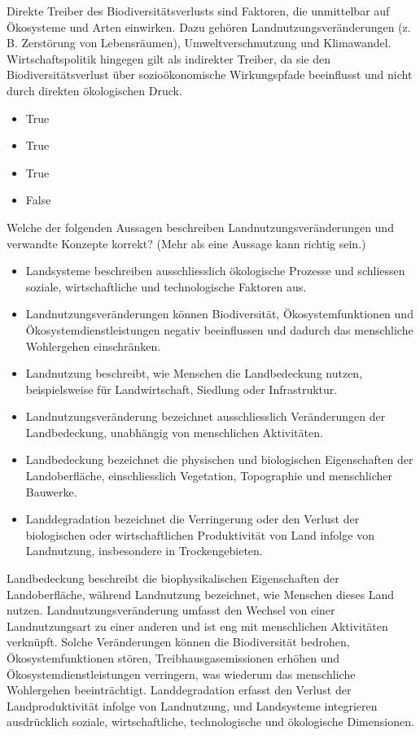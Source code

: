 \documentclass[
  nswissgerman,
  a4paper,
  DIV=11,
  numbers=noendperiod,
  oneside,
  openany]{scrreprt}
\providecommand{\tightlist}{%
  \setlength{\itemsep}{0pt}\setlength{\parskip}{0pt}}
\begin{document}
Direkte Treiber des Biodiversitätsverlusts sind Faktoren, die
unmittelbar auf Ökosysteme und Arten einwirken. Dazu gehören
Landnutzungsveränderungen (z. B. Zerstörung von Lebensräumen),
Umweltverschmutzung und Klimawandel. Wirtschaftspolitik hingegen gilt
als indirekter Treiber, da sie den Biodiversitätsverlust über
sozioökonomische Wirkungspfade beeinflusst und nicht durch direkten
ökologischen Druck.

\begin{itemize}
\tightlist
\item
  True
\item
  True
\item
  True
\item
  False
\end{itemize}

Welche der folgenden Aussagen beschreiben Landnutzungsveränderungen und
verwandte Konzepte korrekt? (Mehr als eine Aussage kann richtig sein.)

\begin{itemize}
\tightlist
\item[$\square$]
  Landsysteme beschreiben ausschliesslich ökologische Prozesse und
  schliessen soziale, wirtschaftliche und technologische Faktoren aus.
\item[$\square$]
  Landnutzungsveränderungen können Biodiversität, Ökosystemfunktionen
  und Ökosystemdienstleistungen negativ beeinflussen und dadurch das
  menschliche Wohlergehen einschränken.
\item[$\square$]
  Landnutzung beschreibt, wie Menschen die Landbedeckung nutzen,
  beispielsweise für Landwirtschaft, Siedlung oder Infrastruktur.
\item[$\square$]
  Landnutzungsveränderung bezeichnet ausschliesslich Veränderungen der
  Landbedeckung, unabhängig von menschlichen Aktivitäten.
\item[$\square$]
  Landbedeckung bezeichnet die physischen und biologischen Eigenschaften
  der Landoberfläche, einschliesslich Vegetation, Topographie und
  menschlicher Bauwerke.
\item[$\square$]
  Landdegradation bezeichnet die Verringerung oder den Verlust der
  biologischen oder wirtschaftlichen Produktivität von Land infolge von
  Landnutzung, insbesondere in Trockengebieten.
\end{itemize}

Landbedeckung beschreibt die biophysikalischen Eigenschaften der
Landoberfläche, während Landnutzung bezeichnet, wie Menschen dieses Land
nutzen. Landnutzungsveränderung umfasst den Wechsel von einer
Landnutzungsart zu einer anderen und ist eng mit menschlichen
Aktivitäten verknüpft. Solche Veränderungen können die Biodiversität
bedrohen, Ökosystemfunktionen stören, Treibhausgasemissionen erhöhen und
Ökosystemdienstleistungen verringern, was wiederum das menschliche
Wohlergehen beeinträchtigt. Landdegradation erfasst den Verlust der
Landproduktivität infolge von Landnutzung, und Landsysteme integrieren
ausdrücklich soziale, wirtschaftliche, technologische und ökologische
Dimensionen.
\end{document}
